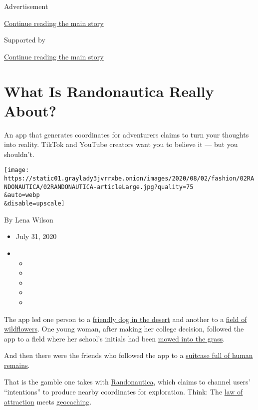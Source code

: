 Advertisement

\protect\hyperlink{after-top}{Continue reading the main story}

Supported by

\protect\hyperlink{after-sponsor}{Continue reading the main story}

\hypertarget{what-is-randonautica-really-about}{%
\section{What Is Randonautica Really
About?}\label{what-is-randonautica-really-about}}

An app that generates coordinates for adventurers claims to turn your
thoughts into reality. TikTok and YouTube creators want you to believe
it --- but you shouldn't.

\texttt{[image: https://static01.graylady3jvrrxbe.onion/images/2020/08/02/fashion/02RANDONAUTICA/02RANDONAUTICA-articleLarge.jpg?quality=75\\\&auto=webp\\\&disable=upscale]}

By Lena Wilson

\begin{itemize}
\item
  July 31, 2020
\item
  \begin{itemize}
  \item
  \item
  \item
  \item
  \item
  \end{itemize}
\end{itemize}

The app led one person to a
\href{https://vm.tiktok.com/JNK12b4/}{friendly dog in the desert} and
another to a
\href{https://www.reddit.com/r/randonauts/comments/hjfwea/first_time_intention_was_pretty_flowers_took_me/}{field
of wildflowers}. One young woman, after making her college decision,
followed the app to a field where her school's initials had been
\href{https://vm.tiktok.com/JNKFyW3/}{mowed into the grass}.

And then there were the friends who followed the app to a
\href{https://vm.tiktok.com/JNKJHA5/}{suitcase full of human remains}.

That is the gamble one takes with
\href{https://www.randonautica.com/}{Randonautica}, which claims to
channel users' ``intentions'' to produce nearby coordinates for
exploration. Think: The
\href{https://www.nytimes3xbfgragh.onion/2010/09/26/books/review/Chabris-t.html?searchResultPosition=5}{law
of attraction} meets
\href{https://www.nytimes3xbfgragh.onion/2018/08/29/nyregion/new-york-city-geocachers-paradise.html?searchResultPosition=3}{geocaching}.

